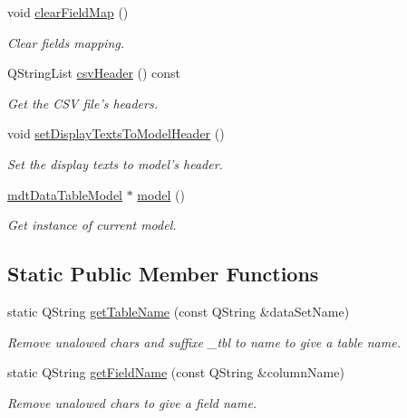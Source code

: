 \begin{DoxyCompactItemize}
void \hyperlink{classmdt_data_table_manager_a10c9f9d57d6c35fa5721906c79376ec4}{clearFieldMap} ()
\begin{DoxyCompactList}\small\item\em Clear fields mapping. \end{DoxyCompactList}\item 
QStringList \hyperlink{classmdt_data_table_manager_a785fbce3537e9e75ecdd49d29a6e8959}{csvHeader} () const 
\begin{DoxyCompactList}\small\item\em Get the CSV file's headers. \end{DoxyCompactList}\item 
void \hyperlink{classmdt_data_table_manager_a87e9b26f462165c93a64f8ac6080b13d}{setDisplayTextsToModelHeader} ()
\begin{DoxyCompactList}\small\item\em Set the display texts to model's header. \end{DoxyCompactList}\item 
\hyperlink{classmdt_data_table_model}{mdtDataTableModel} $\ast$ \hyperlink{classmdt_data_table_manager_a4033591be8c92f6806363515bad9413f}{model} ()
\begin{DoxyCompactList}\small\item\em Get instance of current model. \end{DoxyCompactList}\end{DoxyCompactItemize}
\subsection*{Static Public Member Functions}
\begin{DoxyCompactItemize}
\item 
\hypertarget{classmdt_data_table_manager_aba53817fb6bd1df5850f53424708ffba}{
static QString \hyperlink{classmdt_data_table_manager_aba53817fb6bd1df5850f53424708ffba}{getTableName} (const QString \&dataSetName)}
\label{classmdt_data_table_manager_aba53817fb6bd1df5850f53424708ffba}

\begin{DoxyCompactList}\small\item\em Remove unalowed chars and suffixe \_\-tbl to name to give a table name. \end{DoxyCompactList}\item 
\hypertarget{classmdt_data_table_manager_a1536b620cfabb8b76e0f5b840cd30bd3}{
static QString \hyperlink{classmdt_data_table_manager_a1536b620cfabb8b76e0f5b840cd30bd3}{getFieldName} (const QString \&columnName)}
\label{classmdt_data_table_manager_a1536b620cfabb8b76e0f5b840cd30bd3}

\begin{DoxyCompactList}\small\item\em Remove unalowed chars to give a field name. \end{DoxyCompactList}\end{DoxyCompactItemize}



